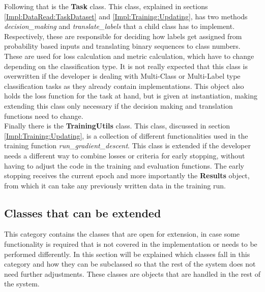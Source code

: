 Following that is the \textbf{Task} class. This class, explained in sections \ref{Impl:DataRead:TaskDataset} and \ref{Impl:Training:Updating}, has two methods \textit{decision\_making} and \textit{translate\_labels} that a child class has to implement. Respectively, these are responsible for deciding how labels get assigned from probability based inputs and translating binary sequences to class numbers. These are used for loss calculation and metric calculation, which have to change depending on the classification type. It is not really expected that this class is overwritten if the developer is dealing with Multi-Class or Multi-Label type classification tasks as they already contain implementations. This object also holds the loss function for the task at hand, but is given at instantiation, making extending this class only necessary if the decision making and translation functions need to change.\\

Finally there is the \textbf{TrainingUtils} class. This class, discussed in section \ref{Impl:Training:Updating}, is a collection of different functionalities used in the training function \textit{run\_gradient\_descent}. This class is extended if the developer needs a different way to combine losses or criteria for early stopping, without having to adjust the code in the training and evaluation functions. The early stopping receives the current epoch and more importantly the \textbf{Results} object, from which it can take any previously written data in the training run. \\

\subsection{Classes that can be extended}

This category contains the classes that are open for extension, in case some functionality is required that is not covered in the implementation or needs to be performed differently. In this section will be explained which classes fall in this category and how they can be subclassed so that the rest of the system does not need further adjustments. These classes are objects that are handled in the rest of the system. \\

